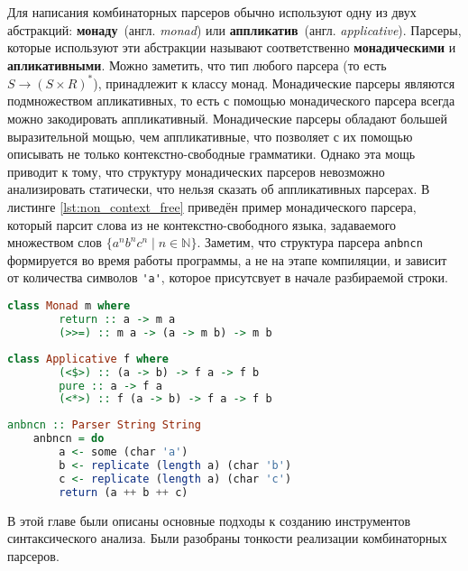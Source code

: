\documentclass[times]{itmo-student-thesis}
\begin{document}
Для написания комбинаторных парсеров обычно используют одну из двух абстракций: \textbf{монаду}~(англ.
\textit{monad})	или \textbf{аппликатив}~(англ. \textit{applicative}). Парсеры, которые используют эти
абстракции называют соответственно  \textbf{монадическими} и \textbf{апликативными}. Можно заметить, что тип любого
парсера (то есть $S \rightarrow (S \times R)^*$),  принадлежит к классу монад\cite{hutton_monadic_nodate}. Монадические парсеры
являются подмножеством апликативных, то есть с помощью монадического парсера всегда можно закодировать аппликативный.
Монадические парсеры обладают большей выразительной мощью, чем аппликативные, что позволяет с их помощью описывать не
только	    контекстно-свободные грамматики. Однако эта мощь приводит к тому, что структуру монадических парсеров
невозможно анализировать статически, что нельзя сказать об аппликативных парсерах. В листинге \ref{lst:non_context_free}
приведён пример монадического парсера,	который парсит слова из не контекстно-свободного языка, задаваемого множеством
слов $\{a^nb^nc^n \mid n \in \mathbb{N}\}$. Заметим, что структура парсера \lstinline{anbncn} формируется во время работы
программы, а не на этапе компиляции, и зависит от количества символов \lstinline{'a'}, которое присутсвует в
начале разбираемой строки.

\begin{lstlisting}[language=Haskell,float=!h,caption={Класс монад в Haskell},label={lst:monad_typeclass}]
    class Monad m where
        return :: a -> m a
        (>>=) :: m a -> (a -> m b) -> m b
\end{lstlisting}

\begin{lstlisting}[language=Haskell,float=!h,caption={Класс аппликативов в Haskell},label={lst:applicative_typeclass}]
    class Applicative f where
        (<$>) :: (a -> b) -> f a -> f b
        pure :: a -> f a
        (<*>) :: f (a -> b) -> f a -> f b
\end{lstlisting}

\begin{lstlisting}[language=Haskell,caption={Монадический парсер для не КС языка},label={lst:non_context_free}]
    anbncn :: Parser String String
    anbncn = do
        a <- some (char 'a')
        b <- replicate (length a) (char 'b')
        c <- replicate (length a) (char 'c')
        return (a ++ b ++ c)
\end{lstlisting}

\chapterconclusion

В этой главе были описаны основные подходы к созданию инструментов синтаксического анализа. Были разобраны тонкости реализации 
комбинаторных парсеров.
\end{document}
